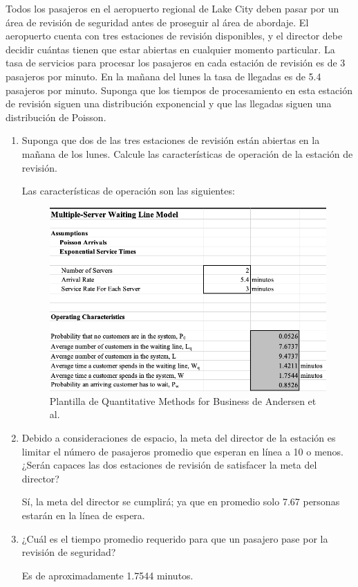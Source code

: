 \begin{problema}
	Todos los pasajeros en el aeropuerto regional de Lake City deben pasar por un área de revisión de seguridad antes de proseguir al área de abordaje. El aeropuerto cuenta con tres estaciones de revisión disponibles, y el director debe decidir cuántas tienen que estar abiertas en cualquier momento particular. La tasa de servicios para procesar los pasajeros en cada estación de revisión es de 3 pasajeros por minuto. En la mañana del lunes la tasa de llegadas es de 5.4 pasajeros por minuto. Suponga que los tiempos de procesamiento en esta estación de revisión siguen una distribución exponencial y que las llegadas siguen una distribución de Poisson.
	\begin{enumerate}
		\item Suponga que dos de las tres estaciones de revisión están abiertas en la mañana de los lunes. Calcule las características de operación de la estación de revisión.
		\begin{sol}
			Las características de operación son las siguientes: 
			\begin{figure}[H]
				\centering
				\includegraphics[scale=0.4]{Images/5}
				\caption{Plantilla de Quantitative Methods for Business de Andersen et al. }
			\end{figure}
		\end{sol}
		\item Debido a consideraciones de espacio, la meta del director de la estación es limitar el número de pasajeros promedio que esperan en línea a 10 o menos. ¿Serán capaces las dos estaciones de revisión de satisfacer la meta del director?
		\begin{sol}
			Sí, la meta del director se cumplirá; ya que en promedio solo 7.67 personas estarán en la línea de espera. 
		\end{sol}
		\item ¿Cuál es el tiempo promedio requerido para que un pasajero pase por la revisión de seguridad?
		\begin{sol}
			Es de aproximadamente 1.7544 minutos. 
		\end{sol}
	\end{enumerate}
\end{problema}


